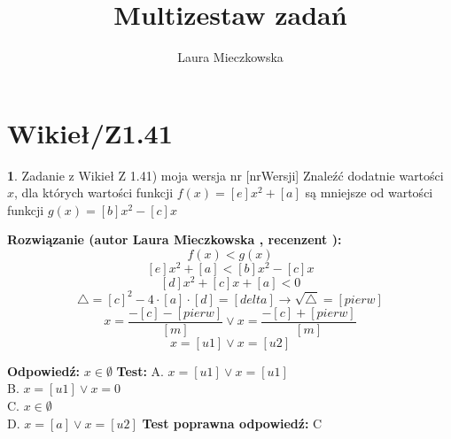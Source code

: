 \documentclass[12pt, a4paper]{article}
\title{Multizestaw zadań}
\author{Laura Mieczkowska}
\date{}
\theoremstyle{definition} %
\newtheorem{zad}{}
\newcommand{\kategoria}[1]{\section{#1}} %
\newcommand{\zadStart}[1]{\begin{zad}#1\newline} %
\newcommand{\zadStop}{\end{zad}}   %
\newcommand{\rozwStart}[2]{\noindent \textbf{Rozwiązanie (autor #1 , recenzent #2): }\newline} %
\newcommand{\odpStart}{\noindent \textbf{Odpowiedź:}\newline}    %
\newcommand{\odpStop}{\newline}                                             %
\newcommand{\testStart}{\noindent \textbf{Test:}\newline} %
\newcommand{\testStop}{\newline} %
\newcommand{\kluczStart}{\noindent \textbf{Test poprawna odpowiedź:}\newline} %
\newcommand{\kluczStop}{\newline} %
\begin{document}
\maketitle


\kategoria{Wikieł/Z1.41}
\zadStart{Zadanie z Wikieł Z 1.41) moja wersja nr [nrWersji]}
Znaleźć dodatnie wartości $x$, dla których wartości funkcji $f(x)=[e]x^2+[a]$ są mniejsze od wartości funkcji $g(x)=[b]x^2-[c]x$
\zadStop
\rozwStart{Laura Mieczkowska}{}
$$f(x)<g(x)$$
$$[e]x^2+[a]<[b]x^2-[c]x$$ 
$$[d]x^2+[c]x+[a]<0$$
$$\triangle =[c]^2-4\cdot[a]\cdot[d]=[delta]\rightarrow \sqrt{\triangle}=[pierw]$$
$$x=\frac{-[c]-[pierw]}{[m]} \vee x=\frac{-[c]+[pierw]}{[m]}$$
$$x=[u1] \vee x=[u2]$$

\odpStart
$x\in\emptyset$
\odpStop
\testStart
A. $x=[u1] \vee x=[u1]$ \\
B. $x=[u1] \vee x=0$ \\
C. $x\in\emptyset$ \\
D. $x=[a] \vee x=[u2]$ 
\testStop
\kluczStart
C
\kluczStop
\end{document}
